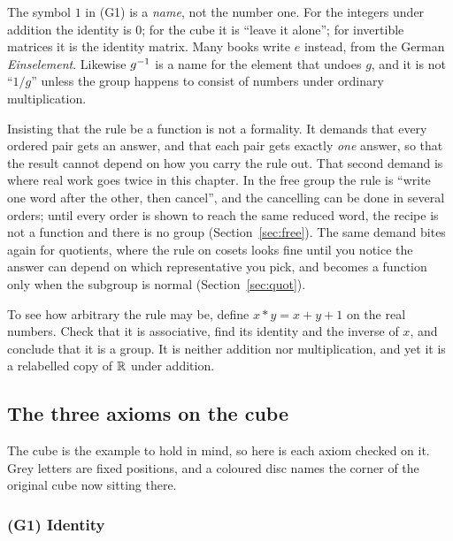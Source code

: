 \begin{rem}
The symbol $1$ in (G1) is a \emph{name}, not the number one. For the integers under addition the
identity is $0$; for the cube it is ``leave it alone''; for invertible matrices it is the identity
matrix. Many books write $e$ instead, from the German \emph{Einselement}. Likewise $g^{-1}$ is a
name for the element that undoes $g$, and it is not ``$1/g$'' unless the group happens to consist
of numbers under ordinary multiplication.
\end{rem}

\begin{rem}
Insisting that the rule be a function is not a formality. It demands that every ordered pair gets
an answer, and that each pair gets exactly \emph{one} answer, so that the result cannot depend on
how you carry the rule out. That second demand is where real work goes twice in this chapter. In
the free group the rule is ``write one word after the other, then cancel'', and the cancelling can
be done in several orders; until every order is shown to reach the same reduced word, the recipe is
not a function and there is no group (Section~\ref{sec:free}). The same demand bites again for
quotients, where the rule on cosets looks fine until you notice the answer can depend on which
representative you pick, and becomes a function only when the subgroup is normal
(Section~\ref{sec:quot}).
\end{rem}

\begin{tryit}
To see how arbitrary the rule may be, define $x*y=x+y+1$ on the real numbers. Check that it is
associative, find its identity and the inverse of $x$, and conclude that it is a group. It is
neither addition nor multiplication, and yet it is a relabelled copy of $\mathbb{R}$ under addition.
\end{tryit}

\subsection{The three axioms on the cube}

The cube is the example to hold in mind, so here is each axiom checked on it. Grey letters are
fixed positions, and a coloured disc names the corner of the original cube now sitting there.

\subsubsection*{(G1) Identity}

